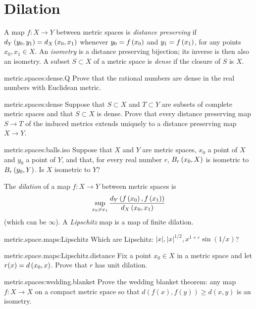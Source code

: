 \section{Dilation}
A map \(f \colon X \to Y\) between metric spaces is \emph{distance preserving}%
%
if \(d_Y\left(y_0,y_1\right)=d_X\left(x_0,x_1\right)\) whenever \(y_0=f\left(x_0\right)\) and \(y_1=f\left(x_1\right)\), for any points \(x_0, x_1 \in X\).
An \emph{isometry} is a distance preserving bijection; its inverse is then also an isometry.
A subset \(S \subset X\) of a metric space is \emph{dense} if the closure of \(S\) is \(X\).
\begin{problem}{metric.spaces:dense.Q}
Prove that the rational numbers are dense in the real numbers with Euclidean metric.
\end{problem}
\begin{problem}{metric.spaces:dense}
Suppose that \(S \subset X\) and \(T \subset Y\) are subsets of complete metric spaces and that \(S \subset X\) is dense.
Prove that every distance preserving map \(S \to T\) of the induced metrics extends uniquely to a distance preserving map \(X \to Y\).
\end{problem}
\begin{problem}{metric.spaces:balls.iso}
Suppose that \(X\) and \(Y\) are metric spaces, \(x_0\) a point of \(X\) and \(y_0\) a point of \(Y\), and that, for every real number \(r\), \(\ball[X]{r}{x_0}\) is isometric to \(\ball[Y]{r}{y_0}\).
Is \(X\) isometric to \(Y\)?
\end{problem}
The \emph{dilation} of a map \(f \colon X \to Y\) between metric spaces is 
\[
\sup_{x_0 \ne x_1}
\frac{d_Y\left(f\left(x_0\right),f\left(x_1\right)\right)}{d_X\left(x_0,x_1\right)}
\]
(which can be \(\infty\)).
A \emph{Lipschitz} map is a map of finite dilation.
\begin{problem}{metric.space.maps:Lipschitz}
Which are Lipschitz: \(|x|, |x|^{1/2}, x^{1+\varepsilon} \sin(1/x)\)?
\end{problem}
\begin{problem}{metric.space.maps:Lipschitz.distance}
Fix a point \(x_0 \in X\) in a metric space and let \(r(x)=d\left(x_0,x\right)\).
Prove that \(r\) has unit dilation.
\end{problem}
\begin{problem*}{metric.spaces:wedding.blanket}
Prove the wedding blanket theorem: any map \(f \colon X \to X\) on a compact metric space so that \(d(f(x),f(y))\ge d(x,y)\) is an isometry.
\end{problem*}
